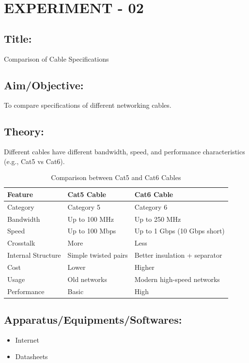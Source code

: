 \documentclass[a4paper,10pt]{article}
\begin{document}
\newpage
\section{EXPERIMENT - 02}
\subsection{Title:}
Comparison of Cable Specifications

\subsection{Aim/Objective:}
To compare specifications of different networking cables.

\subsection{Theory:}
Different cables have different bandwidth, speed, and performance characteristics (e.g., Cat5 vs Cat6).
\begin{table}[h]
\centering
\begin{tabular}{lll}
\toprule
\textbf{Feature} & \textbf{Cat5 Cable} & \textbf{Cat6 Cable} \\
\midrule
Category           & Category 5           & Category 6                    \\
Bandwidth          & Up to 100 MHz        & Up to 250 MHz                 \\
Speed              & Up to 100 Mbps       & Up to 1 Gbps (10 Gbps short)  \\
Crosstalk          & More                 & Less                          \\
Internal Structure & Simple twisted pairs & Better insulation + separator \\
Cost               & Lower                & Higher                        \\
Usage              & Old networks         & Modern high-speed networks    \\
Performance        & Basic                & High                          \\
\bottomrule
\end{tabular}
\caption{Comparison between Cat5 and Cat6 Cables}
\end{table}

\subsection{Apparatus/Equipments/Softwares:}
\begin{itemize}
    \item Internet
    \item Datasheets
\end{itemize}
\end{document}
